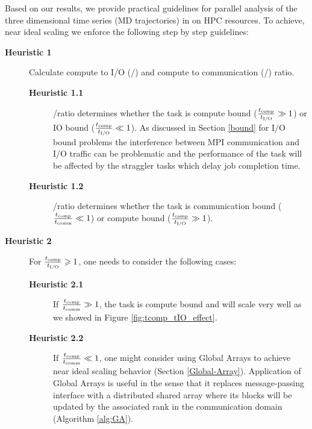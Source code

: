 \label{guideline}
Based on our results, we provide practical guidelines for parallel analysis of the three dimensional time series (MD trajectories) in  on HPC resources.
To achieve, near ideal scaling we enforce the following step by step guidelines:

\begin{description}
  \item[\textbf{Heuristic 1}] Calculate compute to I/O (\tcomp/\tIO) and compute to communication (\tcomp/\tcomm) ratio. 
  \begin{description}
  \item[\textbf{Heuristic 1.1}] \tcomp/\tIO ratio determines whether the task is compute bound ($\frac{{t}_{\text{comp}}}{{t}_{\text{I/O}}} \gg 1$) or IO bound ($\frac{{t}_{\text{comp}}}{{t}_{\text{I/O}}} \ll 1$). 
  As discussed in Section \ref{bound} for I/O bound problems the interference between MPI communication and I/O traffic can be problematic \cite{VMD2013, Kevin2018} and the performance of the task will be affected by the straggler tasks which delay job completion time.  
  \item[\textbf{Heuristic 1.2}] \tcomp/\tcomm ratio determines whether the task is communication bound ($\frac{{t}_{\text{comp}}}{t_{\text{comm}}} \ll 1$) or compute bound ($\frac{{t}_{\text{comp}}}{{t}_{\text{I/O}}} \gg 1$).
  \end{description}
  
  \item[\textbf{Heuristic 2}] For $\frac{{t}_{\text{comp}}}{{t}_{\text{I/O}}} \geqslant 1$, one needs to consider the following cases: 
  \begin{description}
  \item[\textbf{Heuristic 2.1}] If $\frac{{t}_{\text{comp}}}{t_{\text{comm}}} \gg 1$, the task is compute bound and will scale very well as we showed in Figure \ref{fig:tcomp_tIO_effect}.
  \item[\textbf{Heuristic 2.2}] If $\frac{{t}_{\text{comp}}}{t_{\text{comm}}} \ll 1$, one might consider using Global Arrays to achieve near ideal scaling behavior (Section \ref{Global-Array}). 
  Application of Global Arrays is useful in the sense that it replaces message-passing interface with a distributed shared array where its 
  blocks will be updated by the associated rank in the communication domain (Algorithm \ref{alg:GA}). 
  \end{description}
  

\end{description}
